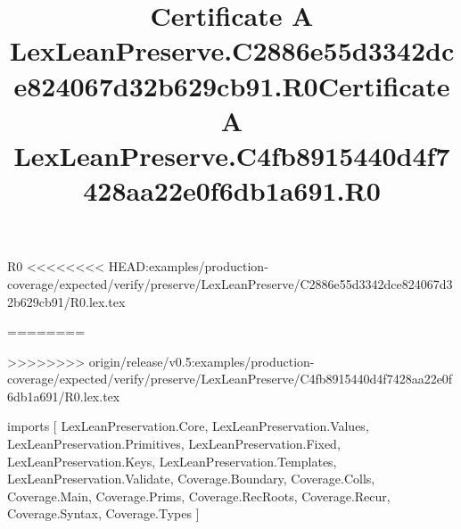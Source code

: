 \begin{lexlean}{R0}
<<<<<<<< HEAD:examples/production-coverage/expected/verify/preserve/LexLeanPreserve/C2886e55d3342dce824067d32b629cb91/R0.lex.tex
\title{Certificate A LexLeanPreserve.C2886e55d3342dce824067d32b629cb91.R0}
========
\title{Certificate A LexLeanPreserve.C4fb8915440d4f7428aa22e0f6db1a691.R0}
>>>>>>>> origin/release/v0.5:examples/production-coverage/expected/verify/preserve/LexLeanPreserve/C4fb8915440d4f7428aa22e0f6db1a691/R0.lex.tex
\begin{coremodule}
imports [
  LexLeanPreservation.Core,
  LexLeanPreservation.Values,
  LexLeanPreservation.Primitives,
  LexLeanPreservation.Fixed,
  LexLeanPreservation.Keys,
  LexLeanPreservation.Templates,
  LexLeanPreservation.Validate,
  Coverage.Boundary,
  Coverage.Colls,
  Coverage.Main,
  Coverage.Prims,
  Coverage.RecRoots,
  Coverage.Recur,
  Coverage.Syntax,
  Coverage.Types
]


\end{coremodule}
\end{lexlean}
